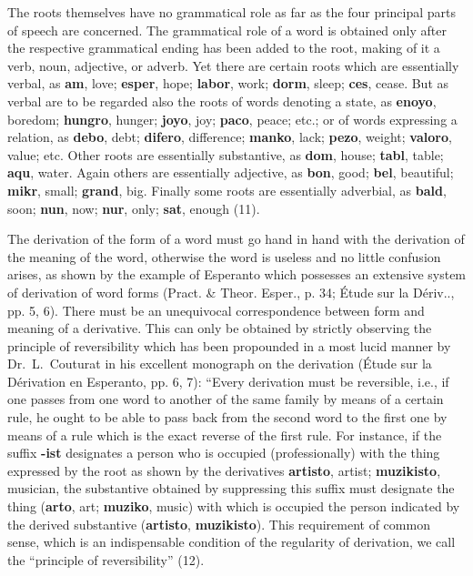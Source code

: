 The roots themselves have no grammatical role as far as the four principal parts of speech are concerned. The grammatical role of a word is obtained only after the respective grammatical ending has been added to the root, making of it a verb, noun, adjective, or adverb. Yet there are certain roots which are essentially verbal, as \textbf{am}, love; \textbf{esper}, hope; \textbf{labor}, work; \textbf{dorm}, sleep; \textbf{ces}, cease. But as verbal are to be regarded also the roots of words denoting a state, as \textbf{enoyo}, boredom; \textbf{hungro}, hunger; \textbf{joyo}, joy; \textbf{paco}, peace; etc.; or of words expressing a relation, as \textbf{debo}, debt; \textbf{difero}, difference; \textbf{manko}, lack; \textbf{pezo}, weight; \textbf{valoro}, value; etc. Other roots are essentially substantive, as \textbf{dom}, house; \textbf{tabl}, table; \textbf{aqu}, water. Again others are essentially adjective, as \textbf{bon}, good; \textbf{bel}, beautiful; \textbf{mikr}, small; \textbf{grand}, big. Finally some roots are essentially adverbial, as \textbf{bald}, soon; \textbf{nun}, now; \textbf{nur}, only; \textbf{sat}, enough (11). \label{parts}

The derivation of the form of a word must go hand in hand with the derivation of the meaning of the word, otherwise the word is useless and no little confusion arises, as shown by the example of Esperanto which possesses an extensive system of derivation of word forms (Pract. \& Theor. Esper., p. 34; Étude sur la Dériv.., pp. 5, 6). There must be an unequivocal correspondence between form and meaning of a derivative. This can only be obtained by strictly observing the principle of reversibility which has been propounded in a most lucid manner by Dr.~L.~Couturat in his excellent monograph on the derivation (Étude sur la Dérivation en Esperanto, pp. 6, 7): “Every derivation must be reversible, i.e., if one passes from one word to another of the same family by means of a certain rule, he ought to be able to pass back from the second word to the first one by means of a rule which is the exact reverse of the first rule. For instance, if the suffix \textbf{-ist} designates a person who is occupied (professionally) with the thing expressed by the root as shown by the derivatives \textbf{artisto}, artist; \textbf{muzikisto}, musician, the substantive obtained by suppressing this suffix must designate the thing (\textbf{arto}, art; \textbf{muziko}, music) with which is occupied the person indicated by the derived substantive (\textbf{artisto}, \textbf{muzikisto}). This requirement of common sense, which is an indispensable condition of the regularity of derivation, we call the “principle of reversibility” (12). \label{reversibility}

